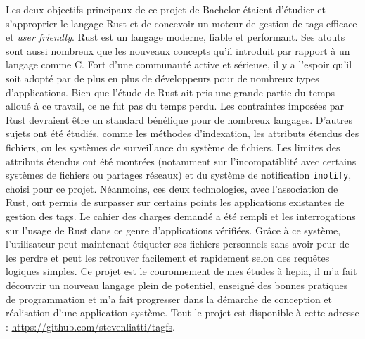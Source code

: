 Les deux objectifs principaux de ce projet de Bachelor étaient d'étudier et s'approprier le 
langage Rust et de concevoir un moteur de gestion de tags efficace et \textit{user friendly}.
Rust est un langage moderne, fiable et performant. Ses atouts sont aussi nombreux que les nouveaux 
concepts qu'il introduit par rapport à un langage comme C. Fort d'une communauté active et sérieuse, 
il y a l'espoir qu'il soit adopté par de plus en plus de développeurs pour de nombreux types d'applications.
Bien que l'étude de Rust ait pris une grande partie du temps alloué à ce travail, ce ne fut pas du 
temps perdu. Les contraintes imposées par Rust devraient être un standard bénéfique pour de nombreux 
langages. 
\bigbreak
D'autres sujets ont été étudiés, comme les méthodes d'indexation, les attributs étendus des fichiers, 
ou les systèmes de surveillance du système de fichiers. Les limites des attributs étendus ont été 
montrées (notamment sur l'incompatiblité avec certains systèmes de fichiers ou partages réseaux) 
et du système de notification \texttt{inotify}, choisi pour ce projet. Néanmoins, ces 
deux technologies, avec l'association de Rust, ont permis de surpasser sur certains points les 
applications existantes de gestion des tags. Le cahier des charges demandé 
a été rempli et les interrogations sur l'usage de Rust dans ce genre d'applications vérifiées. 
Grâce à ce système, l'utilisateur peut maintenant étiqueter ses fichiers personnels sans avoir 
peur de les perdre et peut les retrouver facilement et rapidement selon des requêtes logiques 
simples. 
\bigbreak
Ce projet est le couronnement de mes études à hepia, il m'a fait découvrir un nouveau langage 
plein de potentiel, enseigné des bonnes pratiques de programmation et m'a fait progresser dans 
la démarche de conception et réalisation d'une application système. Tout le projet est disponible 
à cette adresse : \url{https://github.com/stevenliatti/tagfs}.
